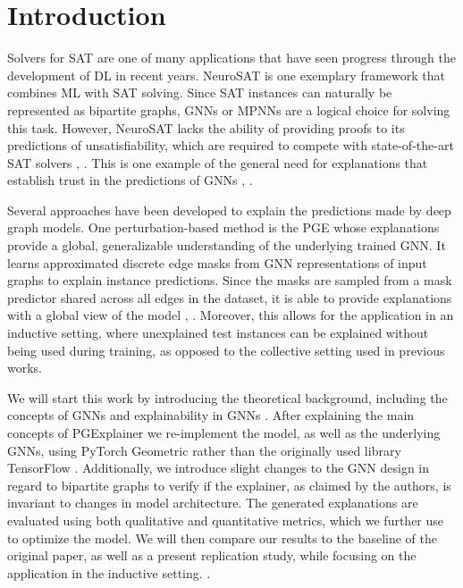\chapter{Introduction}
\label{ch:Introduction}

Solvers for \ac{SAT} are one of many applications that have seen progress through the development of \ac{DL} in recent years. NeuroSAT \cite{selsam2018learning} is one exemplary framework that combines \ac{ML} with SAT solving. Since SAT instances can naturally be represented as bipartite graphs, \acp{GNN} or \acp{MPNN} are a logical choice for solving this task. However, NeuroSAT lacks the ability of providing proofs to its predictions of unsatisfiability, which are required to compete with state-of-the-art SAT solvers \cite{audemard2009predicting}, \cite{een2003extensible}. This is one example of the general need for explanations that establish trust in the predictions of GNNs \cite{guo2023machine}, \cite{ribeiro2016should}. \bigskip

Several approaches have been developed to explain the predictions made by deep graph models. One perturbation-based method is the \ac{PGE} \cite{luo2020parameterized} whose explanations provide a global, generalizable understanding of the underlying trained GNN. It learns approximated discrete edge masks from GNN representations of input graphs to explain instance predictions. Since the masks are sampled from a mask predictor shared across all edges in the dataset, it is able to provide explanations with a global view of the model \cite{luo2020parameterized}, \cite{yuan2022explainability}. Moreover, this allows for the application in an inductive setting, where unexplained test instances can be explained without being used during training, as opposed to the collective setting used in previous works.\bigskip

We will start this work by introducing the theoretical background, including the concepts of GNNs and explainability in GNNs \cite{yuan2022explainability}. After explaining the main concepts of PGExplainer \cite{luo2020parameterized} we re-implement the model, as well as the underlying GNNs, using PyTorch Geometric \cite{Fey/Lenssen/2019} rather than the originally used library TensorFlow \cite{tensorflow2015-whitepaper}. Additionally, we introduce slight changes to the GNN design in regard to bipartite graphs to verify if the explainer, as claimed by the authors, is invariant to changes in model architecture. The generated explanations are evaluated using both qualitative and quantitative metrics, which we further use to optimize the model. We will then compare our results to the baseline of the original paper, as well as a present replication study, while focusing on the application in the inductive setting. \cite{holdijk2021re}. \bigskip

